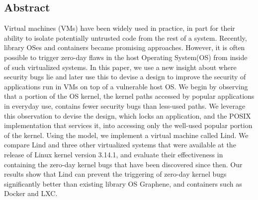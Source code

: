 \subsection*{Abstract}

Virtual machines (VMs) have been widely used in practice, in part for their ability to
isolate potentially untrusted code from the rest of a system. 
Recently, library OSes and containers became promising approaches.  
%
However, it is often possible to trigger zero-day flaws
in the host Operating System(OS) from inside of such virtualized systems. 
%
In this paper, we use a new insight about where security bugs lie and later use
this to devise a design to improve the security of applications
run in VMs on top of a vulnerable host OS. 
We begin by observing that a portion of the OS kernel, the kernel paths accessed
by popular applications in everyday use, contains fewer security bugs than less-used paths. We
leverage this observation to devise the \lip design, which
locks an application, and the POSIX implementation that services it, into
accessing only the well-used popular portion of the kernel.  Using the \lip model, we
implement a virtual machine called Lind. 
%
We compare Lind and three other virtualized systems that were
available at the release of Linux kernel version 3.14.1, and evaluate
their effectiveness in containing the zero-day kernel bugs that have been discovered
since then.
%
Our results show that Lind can prevent the triggering of zero-day kernel bugs significantly better 
than existing library OS Graphene, and containers such as Docker and LXC. 
